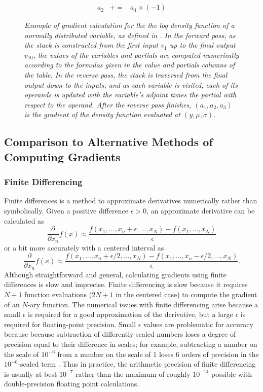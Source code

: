 \documentclass[10pt]{article}
\begin{document}
\begin{figure}
\begin{eqnarray*}
\\
a_{2} & {+}{=} & a_4 \times (-1)
\end{eqnarray*}
\vspace*{-24pt}
\caption{\small\it Example of gradient calculation for the the log
  density function of a normally distributed variable, as defined in
  .  In the forward pass, as the stack is
  constructed from the first input $v_1$ up to the final output
  $v_{10}$, the values of the variables and partials are computed
  numerically according to the formulas given in the value and
  partials columns of the table.  In the reverse pass, the stack is
  traversed from the final output down to the inputs, and as each
  variable is visited, each of its operands is updated with the
  variable's adjoint times the partial with respect to the operand.
  After the reverse pass finishes, $(a_1,a_2,a_3)$ is the gradient of
  the density function evaluated at $(y,\mu,\sigma)$.}
  \label{autodiff-stack.figure}
\end{figure}




\subsection{Comparison to Alternative Methods of Computing Gradients}

\subsubsection{Finite Differencing}

Finite differences is a method to approximate derivatives numerically
rather than symbolically.  Given a positive difference $\epsilon > 0$,
an approximate derivative can be calculated as
\[
\frac{\partial}{\partial x_n} f(x) 
\approx 
\frac{f(x_1,\ldots,x_n + \epsilon, \ldots, x_N) - f(x_1, \ldots, x_N)}
     {\epsilon}
\]
or a bit more accurately with a centered interval as
\[
\frac{\partial}{\partial x_n} f(x) 
\approx 
\frac{f(x_1,\ldots,x_n + \epsilon/2, \ldots, x_N) 
      - f(x_1,\ldots,x_n - \epsilon/2, \ldots, x_N)}
     {\epsilon}.
\]
%
Although straightforward and general, calculating gradients using
finite differences is slow and imprecise.  Finite differencing is slow
because it requires $N + 1$ function evaluations ($2N + 1$ in the
centered case) to compute the gradient of an $N$-ary function.  The
numerical issues with finite differencing arise because a small
$\epsilon$ is required for a good approximation of the derivative, but
a large $\epsilon$ is required for floating-point precision.  Small
$\epsilon$ values are problematic for accuracy because because
subtraction of differently scaled numbers loses a degree of precision
equal to their difference in scales; for example, subtracting a number
on the scale of $10^{-6}$ from a number on the scale of 1 loses 6
orders of precision in the $10^{-6}$-scaled term \citep{higham:2002}.
Thus in practice, the arithmetic precision of finite differencing is
usually at best $10^{-7}$ rather than the maximum of roughly
$10^{-14}$ possible with double-precision floating point calculations.
\end{document}
